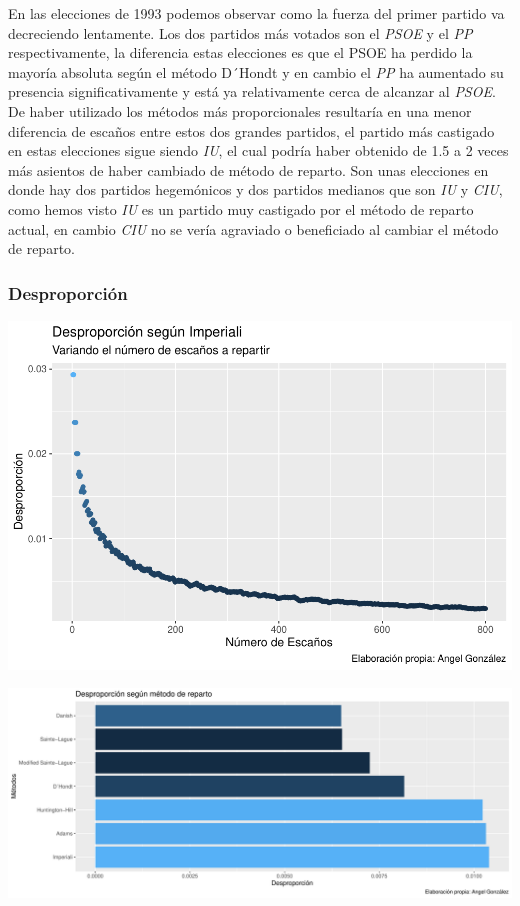 \documentclass[12pt,a4paper,]{book}
\numberwithin{dummy}{section}
\theoremstyle{ocrenumbox}
\theoremstyle{blacknumex}
\theoremstyle{blacknumbox}
\theoremstyle{ocrenum}
\theoremstyle{ocrenum}
\begin{document}
En las elecciones de 1993 podemos observar como la fuerza del primer
partido va decreciendo lentamente. Los dos partidos más votados son el
\emph{PSOE} y el \emph{PP} respectivamente, la diferencia estas
elecciones es que el PSOE ha perdido la mayoría absoluta según el método
D´Hondt y en cambio el \emph{PP} ha aumentado su presencia
significativamente y está ya relativamente cerca de alcanzar al
\emph{PSOE}. De haber utilizado los métodos más proporcionales
resultaría en una menor diferencia de escaños entre estos dos grandes
partidos, el partido más castigado en estas elecciones sigue siendo
\emph{IU}, el cual podría haber obtenido de 1.5 a 2 veces más asientos
de haber cambiado de método de reparto. Son unas elecciones en donde hay
dos partidos hegemónicos y dos partidos medianos que son \emph{IU} y
\emph{CIU}, como hemos visto \emph{IU} es un partido muy castigado por
el método de reparto actual, en cambio \emph{CIU} no se vería agraviado
o beneficiado al cambiar el método de reparto.

\hypertarget{desproporciuxf3n-5}{%
\subsubsection{Desproporción}\label{desproporciuxf3n-5}}

\begin{center}\includegraphics[width=1\linewidth]{figurasR/unnamed-chunk-21-1} \end{center}

\begin{center}\includegraphics[width=1\linewidth]{figurasR/unnamed-chunk-21-2} \end{center}
\end{document}

